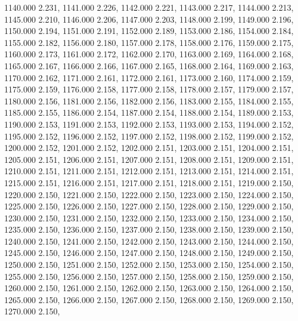 1140.000 2.231, 
1141.000 2.226, 
1142.000 2.221, 
1143.000 2.217, 
1144.000 2.213, 
1145.000 2.210, 
1146.000 2.206, 
1147.000 2.203, 
1148.000 2.199, 
1149.000 2.196, 
1150.000 2.194, 
1151.000 2.191, 
1152.000 2.189, 
1153.000 2.186, 
1154.000 2.184, 
1155.000 2.182, 
1156.000 2.180, 
1157.000 2.178, 
1158.000 2.176, 
1159.000 2.175, 
1160.000 2.173, 
1161.000 2.172, 
1162.000 2.170, 
1163.000 2.169, 
1164.000 2.168, 
1165.000 2.167, 
1166.000 2.166, 
1167.000 2.165, 
1168.000 2.164, 
1169.000 2.163, 
1170.000 2.162, 
1171.000 2.161, 
1172.000 2.161, 
1173.000 2.160, 
1174.000 2.159, 
1175.000 2.159, 
1176.000 2.158, 
1177.000 2.158, 
1178.000 2.157, 
1179.000 2.157, 
1180.000 2.156, 
1181.000 2.156, 
1182.000 2.156, 
1183.000 2.155, 
1184.000 2.155, 
1185.000 2.155, 
1186.000 2.154, 
1187.000 2.154, 
1188.000 2.154, 
1189.000 2.153, 
1190.000 2.153, 
1191.000 2.153, 
1192.000 2.153, 
1193.000 2.153, 
1194.000 2.152, 
1195.000 2.152, 
1196.000 2.152, 
1197.000 2.152, 
1198.000 2.152, 
1199.000 2.152, 
1200.000 2.152, 
1201.000 2.152, 
1202.000 2.151, 
1203.000 2.151, 
1204.000 2.151, 
1205.000 2.151, 
1206.000 2.151, 
1207.000 2.151, 
1208.000 2.151, 
1209.000 2.151, 
1210.000 2.151, 
1211.000 2.151, 
1212.000 2.151, 
1213.000 2.151, 
1214.000 2.151, 
1215.000 2.151, 
1216.000 2.151, 
1217.000 2.151, 
1218.000 2.151, 
1219.000 2.150, 
1220.000 2.150, 
1221.000 2.150, 
1222.000 2.150, 
1223.000 2.150, 
1224.000 2.150, 
1225.000 2.150, 
1226.000 2.150, 
1227.000 2.150, 
1228.000 2.150, 
1229.000 2.150, 
1230.000 2.150, 
1231.000 2.150, 
1232.000 2.150, 
1233.000 2.150, 
1234.000 2.150, 
1235.000 2.150, 
1236.000 2.150, 
1237.000 2.150, 
1238.000 2.150, 
1239.000 2.150, 
1240.000 2.150, 
1241.000 2.150, 
1242.000 2.150, 
1243.000 2.150, 
1244.000 2.150, 
1245.000 2.150, 
1246.000 2.150, 
1247.000 2.150, 
1248.000 2.150, 
1249.000 2.150, 
1250.000 2.150, 
1251.000 2.150, 
1252.000 2.150, 
1253.000 2.150, 
1254.000 2.150, 
1255.000 2.150, 
1256.000 2.150, 
1257.000 2.150, 
1258.000 2.150, 
1259.000 2.150, 
1260.000 2.150, 
1261.000 2.150, 
1262.000 2.150, 
1263.000 2.150, 
1264.000 2.150, 
1265.000 2.150, 
1266.000 2.150, 
1267.000 2.150, 
1268.000 2.150, 
1269.000 2.150, 
1270.000 2.150, 
